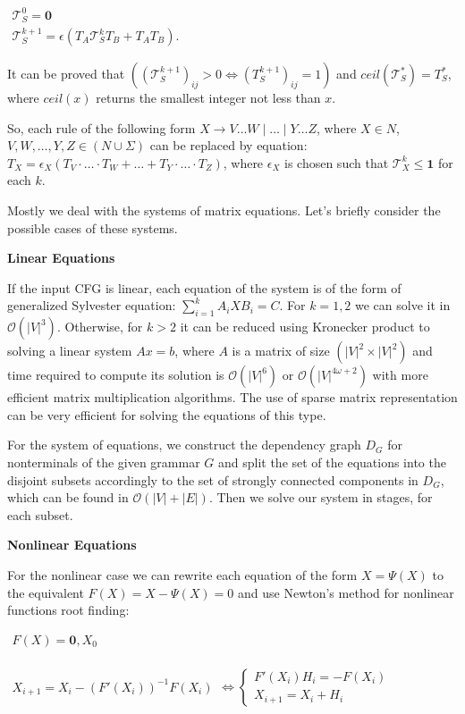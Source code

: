\documentclass[sigconf]{acmart}
\begin{document}
\begin{center}
\(
\left.
\begin{array}{c}
\mathcal{T}_S^0 = \mathbf{0} \\
\mathcal{T}_S^{k+1} = \epsilon(T_A \mathcal{T}_S^k T_B + T_A T_B).
\end{array} 
\right.
\)
\end{center}

It can be proved that $((\mathcal{T}_S^{k+1})_{ij} > 0 \iff (T_S^{k+1})_{ij} = 1)$ and $ceil(\mathcal{T}_S^*) = T_S^*$, where $ceil(x)$ returns the smallest integer not less than $x$.

So, each rule of the following form $X \rightarrow V \ldots W \mid \dots \mid Y \ldots Z$, where $X \in N$, $V, W, \ldots , Y, Z \in (N \cup \Sigma)$ can be replaced by equation:
$T_X = \epsilon_X (T_V \cdot \ldots \cdot T_W + \dots + T_Y \cdot \ldots \cdot T_Z)$, where $\epsilon_X$ is chosen such that $\mathcal{T}_X^{k} \leq \textbf{1}$ for each $k$.

Mostly we deal with the systems of matrix equations. Let's briefly consider the possible cases of these systems.

\textbf{Linear Equations}

If the input CFG is linear, each equation of the system is of the form of generalized Sylvester equation: $\sum_{i = 1}^{k} A_iXB_i = C$.
For $k = 1, 2$ we can solve it in $\mathcal{O}(|V|^3)$.
Otherwise, for $k > 2$ it can be reduced using Kronecker product to solving a linear system $Ax = b$, where $A$ is a matrix of size $(|V|^2 \times |V|^2)$ and time required to compute its solution is $\mathcal{O}(|V|^6)$ or $\mathcal{O}(|V|^{4\omega + 2})$ with more efficient matrix multiplication algorithms. 
The use of sparse matrix representation can be very efficient for solving the equations of this type.

For the system of equations, we construct the dependency graph $D_G$ for nonterminals of the given grammar $G$ and split the set of the equations into the disjoint subsets accordingly to the set of strongly connected components in $D_G$, which can be found in $\mathcal{O}(|V| + |E|)$.
Then we solve our system in stages, for each subset.

\textbf{Nonlinear Equations}

For the nonlinear case we can rewrite each equation of the form $X = \Psi(X)$ to the equivalent $F(X) = X - \Psi(X) = 0$ and use Newton's method for nonlinear functions root finding:

\begin{center}
\(
\left.
\begin{array}{c}
F(X) = \mathbf{0}, X_0 \\
\end{array} 
\right.
\)

\(
\left. 
\begin{array}{l}
X_{i+1} = X_i - (F'(X_i))^{-1}F(X_i) 
\end{array} 
\right.
\iff 
\left\{
\begin{array}{l}
F'(X_i)H_i = - F(X_i) \\
X_{i+1} = X_i + H_i
\end{array} 
\right.
\)
\end{center}
\end{document}
